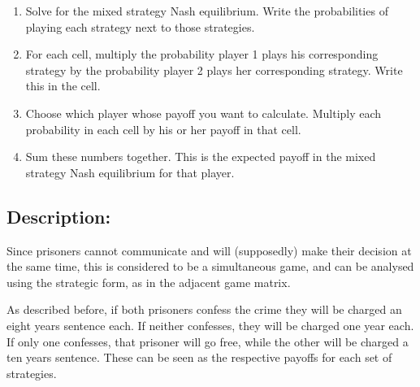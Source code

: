 \documentclass[]{report}
\begin{document}
\begin{enumerate}
	\item Solve for the mixed strategy Nash equilibrium. Write the probabilities of playing each strategy next to those strategies.
	\item	For each cell, multiply the probability player 1 plays his corresponding strategy by the probability player 2 plays her corresponding strategy. Write this in the cell.
	\item	Choose which player whose payoff you want to calculate. Multiply each probability in each cell by his or her payoff in that cell.
	\item	Sum these numbers together. This is the expected payoff in the mixed strategy Nash equilibrium for that player.
\end{enumerate}


\subsection{Description:}

Since prisoners cannot communicate and will (supposedly) make their decision at the same time, this is considered to be a simultaneous game, and can be analysed using the strategic form, as in the adjacent game matrix. 

As described before, if both prisoners confess the crime they will be charged an eight years sentence each. If neither confesses, they will be charged one year each. If only one confesses, that prisoner will go free, while the other will be charged a ten years sentence. These can be seen as the respective payoffs for each set of strategies.
\end{document}
